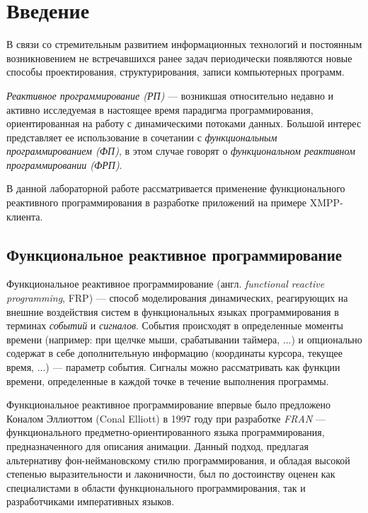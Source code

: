 \section{Введение}
В связи со стремительным развитием информационных технологий и постоянным возникновением
не встречавшихся ранее задач периодически появляются новые способы проектирования, структурирования,
записи компьютерных программ.

\emph{Реактивное программирование (РП)} — возникшая относительно
недавно и активно исследуемая в настоящее время парадигма программирования, ориентированная
на работу с динамическими потоками данных. Большой интерес представляет ее использование
в сочетании с \emph{функциональным программированием (ФП)}, в этом случае говорят о
\emph{функциональном реактивном программировании (ФРП)}.

В данной лабораторной работе рассматривается применение функционального реактивного программирования
в разработке приложений на примере XMPP-клиента.

\subsection{Функциональное реактивное программирование}
Функциональное реактивное программирование (англ. \emph{functional reactive programming}, FRP)
--- способ моделирования динамических, реагирующих на внешние воздействия систем
в функциональных языках программирования в терминах \emph{событий} и \emph{сигналов}.
События происходят в определенные моменты времени (например: при щелчке мыши, срабатывании таймера, ...)
и опционально содержат в себе дополнительную информацию (координаты курсора, текущее время, ...) — параметр события.
Сигналы можно рассматривать как функции времени, определенные в каждой точке в течение выполнения программы.

Функциональное реактивное программирование впервые было предложено Коналом Эллиоттом (Conal Elliott)
в 1997 году при разработке \emph{FRAN} --- функционального предметно-ориентированного языка программирования,
предназначенного для описания анимации.
Данный подход, предлагая альтернативу фон-неймановскому стилю программирования, и обладая
высокой степенью выразительности и лаконичности, был по достоинству оценен как
специалистами в области функционального программирования,
так и разработчиками императивных языков.
